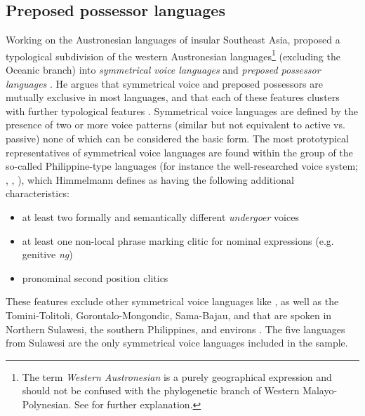 \subsection{Preposed possessor languages}\label{sec:preposed}

Working on the Austronesian languages of insular Southeast Asia, \citeauthor{Himmelmann2005austronesian} proposed a typological subdivision of the western Austronesian languages\footnote{The 
    term \textit{Western Austronesian} is a purely geographical expression and should not be confused with the phylogenetic branch of Western Malayo-Polynesian. See \citet{Himmelmann2005austronesian} 
    for further explanation.
}
(excluding the Oceanic branch) into \emph{symmetrical voice languages} and \emph{preposed possessor languages} \citep{Himmelmann2005austronesian}. He argues that symmetrical voice and preposed possessors are mutually exclusive in most languages, and that each of these features clusters with further typological features \citep[113]{Himmelmann2005austronesian}. Symmetrical voice languages are defined by the presence of two or more voice patterns (similar but not equivalent to active vs. passive) none of which can be considered the basic form. The most prototypical representatives of symmetrical voice languages are found within the group of the so-called Philippine-type languages (for instance the well-researched  voice system; \citealt{schachter1976subject}, \citealt{Himmelmann2005tagalog}, \citealt{riesberg2014symmetrical}), which Himmelmann defines as having the following additional characteristics:

\begin{itemize}
\item at least two formally and semantically different \textit{undergoer} voices
\item at least one non-local phrase marking clitic for nominal expressions (e.g.  genitive \textit{ng})
\item pronominal second position clitics
\end{itemize}

These features exclude other symmetrical voice languages like ,  as well as the Tomini-Tolitoli, Gorontalo-Mongondic, Sama-Bajau, and  that are spoken in Northern Sulawesi, the southern Philippines, and environs \citep[113]{Himmelmann2005austronesian}. The five languages from Sulawesi are the only symmetrical voice languages included in the sample.

